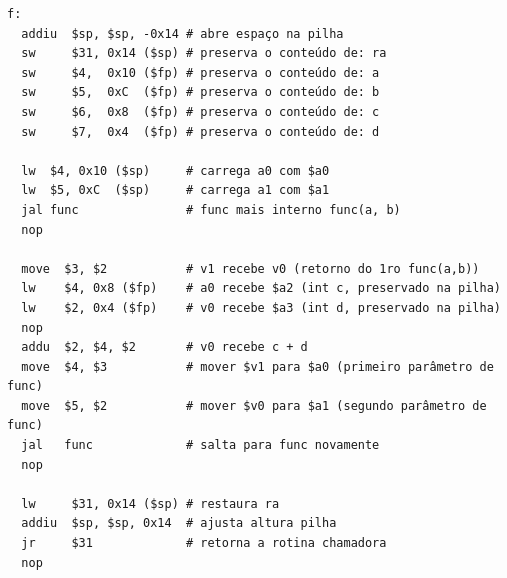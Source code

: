 \documentclass{article}
\begin{document}
\begin{verbatim}
f:
  addiu  $sp, $sp, -0x14 # abre espaço na pilha
  sw     $31, 0x14 ($sp) # preserva o conteúdo de: ra
  sw     $4,  0x10 ($fp) # preserva o conteúdo de: a
  sw     $5,  0xC  ($fp) # preserva o conteúdo de: b
  sw     $6,  0x8  ($fp) # preserva o conteúdo de: c
  sw     $7,  0x4  ($fp) # preserva o conteúdo de: d

  lw  $4, 0x10 ($sp)     # carrega a0 com $a0
  lw  $5, 0xC  ($sp)     # carrega a1 com $a1
  jal func               # func mais interno func(a, b)
  nop

  move  $3, $2           # v1 recebe v0 (retorno do 1ro func(a,b))
  lw    $4, 0x8 ($fp)    # a0 recebe $a2 (int c, preservado na pilha)
  lw    $2, 0x4 ($fp)    # v0 recebe $a3 (int d, preservado na pilha)
  nop
  addu  $2, $4, $2       # v0 recebe c + d
  move  $4, $3           # mover $v1 para $a0 (primeiro parâmetro de func)
  move  $5, $2           # mover $v0 para $a1 (segundo parâmetro de func)
  jal   func             # salta para func novamente
  nop

  lw     $31, 0x14 ($sp) # restaura ra
  addiu  $sp, $sp, 0x14  # ajusta altura pilha
  jr     $31             # retorna a rotina chamadora
  nop
\end{verbatim}
\end{document}
